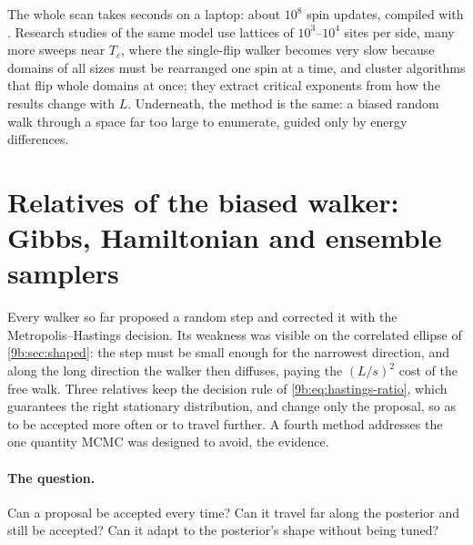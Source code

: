 The whole scan takes seconds on a laptop: about $10^8$ spin updates, compiled with
. Research studies of the same model use lattices of $10^3$--$10^4$ sites per
side, many more sweeps near $T_c$, where the single-flip walker becomes very slow because
domains of all sizes must be rearranged one spin at a time, and cluster algorithms that flip
whole domains at once; they extract critical exponents from how the results change with $L$.
Underneath, the method is the same: a biased random walk through a space far too large to
enumerate, guided only by energy differences.
\section{Relatives of the biased walker: Gibbs, Hamiltonian and ensemble samplers}
\label{9b:sec:relatives}

Every walker so far proposed a random step and corrected it with the Metropolis--Hastings
decision. Its weakness was visible on the correlated ellipse of \cref{9b:sec:shaped}: the step must
be small enough for the narrowest direction, and along the long direction the walker then
diffuses, paying the $(L/s)^2$ cost of the free walk. Three relatives keep the decision rule of
\eqref{9b:eq:hastings-ratio}, which guarantees the right stationary distribution, and change only
the proposal, so as to be accepted more often or to travel further. A fourth method addresses the
one quantity MCMC was designed to avoid, the evidence.

\paragraph{The question.} Can a proposal be accepted every time? Can it travel far along the
posterior and still be accepted? Can it adapt to the posterior's shape without being tuned?

